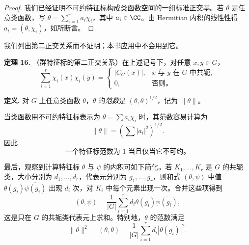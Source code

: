 \begin{proof}
我们已经证明不可约特征标构成类函数空间的一组标准正交基。若 $\theta$ 是任意类函数，写 $\theta=\sum_{i=1}^r a_i\chi_i$，其中 $a_i\in\CC$。由 Hermitian 内积的线性性得 $a_i=(\theta,\chi_i)$，如所断言。
\end{proof}

我们列出第二正交关系而不证明；本书应用中不会用到它。

\medskip
\noindent\textbf{定理 16.} （群特征标的第二正交关系）在上述记号下，对任意 $x,y\in G$，
\[
  \sum_{i=1}^r \chi_i(x)\overline{\chi_i(y)}
  =\begin{cases}
  |C_G(x)|,&x\text{ 与 }y\text{ 在 }G\text{ 中共轭},\\
  0,&\text{否则。}
  \end{cases}
\]

\noindent\textbf{定义.} 对 $G$ 上任意类函数 $\theta$，$\theta$ 的\emph{范数}是 $(\theta,\theta)^{1/2}$，记为 $\|\theta\|$。

当类函数用不可约特征标表示为 $\theta=\sum a_i\chi_i$ 时，其范数容易计算为
\[
  \|\theta\|=\left(\sum |a_i|^2\right)^{1/2}.
\]
因此
\[
  \text{一个特征标范数为 }1\text{ 当且仅当它不可约。}
\]

最后，观察到计算特征标 $\theta$ 与 $\psi$ 的内积可如下简化。若 $K_1,
\ldots,K_r$ 是 $G$ 的共轭类，大小分别为 $d_1,
\ldots,d_r$，代表元分别为 $g_1,
\ldots,g_r$，则和式 $(\theta,\psi)$ 中值 $\theta(g_i)\overline{\psi(g_i)}$ 出现 $d_i$ 次，对 $K_i$ 中每个元素出现一次。合并这些项得到
\[
  (\theta,\psi)=\frac1{|G|}\sum_{i=1}^r d_i\theta(g_i)\overline{\psi(g_i)},
\]
这是只在 $G$ 的共轭类代表元上求和。特别地，$\theta$ 的范数满足
\[
  \|\theta\|^2=(\theta,
  \theta)=\frac1{|G|}\sum_{i=1}^r d_i|\theta(g_i)|^2.
\]

